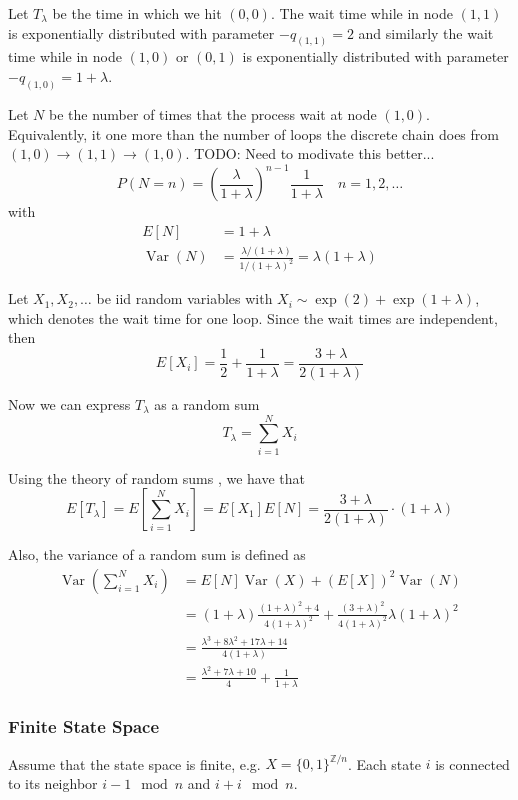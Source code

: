\documentclass{article}
\theoremstyle{plain}
\theoremstyle{definition}
\theoremstyle{remark}
\newcommand{\Z}{\mathbb{Z}}
\newcommand{\Var}{\operatorname {Var}}
\begin{document}
Let $T_\lambda$ be the time in which we hit $(0,0)$.
The wait time while in node $(1,1)$ is exponentially distributed with parameter $- q_{(1,1)} = 2$ and similarly the wait time while in node $(1,0)$ or $(0,1)$ is exponentially distributed with parameter $- q_{(1,0)} = 1 + \lambda$.

Let $N$ be the number of times that the process wait at node $(1,0)$. Equivalently, it one more than the number of loops the discrete chain does from $(1,0) \to (1,1) \to (1,0)$. TODO: Need to modivate this better...
$$
P(N = n) = \left(\frac{\lambda}{1 + \lambda} \right)^{n - 1} \frac{1}{1 + \lambda} \quad n = 1,2,\ldots
$$
with
\begin{align*}
    E[N] &= 1 + \lambda\\
    \Var(N) &= \frac{\lambda/(1 + \lambda)}{1/(1 + \lambda)^2} = \lambda (1 + \lambda)
\end{align*}


Let $X_1, X_2, \ldots$ be iid random variables with $X_i \sim \exp(2) + \exp(1 + \lambda)$, which denotes the wait time for one loop. Since the wait times are independent, then 
$$
E[X_i] = \frac{1}{2} + \frac{1}{1 + \lambda} = \frac{3 + \lambda}{2(1 + \lambda)}
$$

Now we can express $T_\lambda$ as a random sum
$$
T_\lambda = \sum_{i = 1}^N X_i
$$

Using the theory of random sums \cite{Ross97}, we have that
$$
E[T_\lambda] = E\left[ \sum_{i = 1}^N X_i \right] = E[X_1] E[N] = \frac{3 + \lambda}{2(1 + \lambda)} \cdot (1 + \lambda)
$$

Also, the variance of a random sum is defined as
\begin{align*}
    \Var\left( \sum_{i = 1}^N X_i \right) &= E[N]\Var(X) + (E[X])^2 \Var(N)\\
    &= (1 + \lambda) \frac{(1 + \lambda)^2 + 4}{4(1 + \lambda)^2} + \frac{(3 + \lambda)^2}{4 (1 + \lambda)^2} \lambda (1 + \lambda)^2\\
    &= \frac{\lambda^3 + 8 \lambda^2 + 17 \lambda + 14}{4(1 + \lambda)}\\
    &= \frac{\lambda^2 + 7 \lambda + 10}{4} + \frac{1}{1 + \lambda}
\end{align*}

\subsubsection{Finite State Space}
Assume that the state space is finite, e.g. $X = \{ 0,1 \}^{\Z / n}$.
Each state $i$ is connected to its neighbor $i - 1 \mod n$ and $i + i \mod n$.
\end{document}
